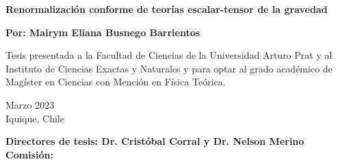 
\begin{titlepage}
	
	
	\thispagestyle{frontpage}
	
	\begin{center}
		
		\vspace*{8\baselineskip}
	
		
		{\Huge \textbf{Renormalización conforme de teorías escalar-tensor de la gravedad\\}}%
		        \vspace*{1.5\baselineskip}

		
        \vspace*{1\baselineskip}

		\large{\textbf{Por: Mairym Eliana Busnego Barrientos}}\\ %
		
		\vspace{1,5\baselineskip}
		
		\large{Tesis presentada a la Facultad de Ciencias de la Universidad Arturo Prat y al Instituto de Ciencias Exactas y Naturales y  para optar al grado académico de Magíster en Ciencias con Mención en Física Teórica.} %
		
		\vspace{1,5\baselineskip}
		\begin{center}
            Marzo 2023 \\
            Iquique, Chile
            \end{center}
\vspace{1.5\baselineskip}

		\large{\textbf{Directores de tesis: Dr. Cristóbal Corral y  Dr. Nelson Merino}}\\ %
            \large{\textbf{Comisión: }}\\
	\end{center}
	
	\vspace*{4\baselineskip}
	
	
\end{titlepage}